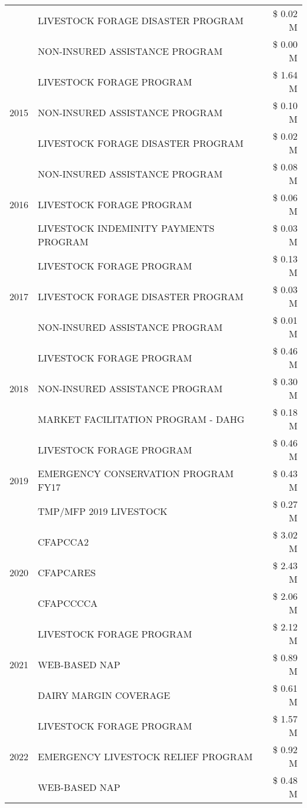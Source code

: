 \begin{tabular}{llr}
 & LIVESTOCK FORAGE DISASTER PROGRAM & \$ 0.02 M \\
 & NON-INSURED ASSISTANCE PROGRAM & \$ 0.00 M \\
\cline{1-3}
\multirow[t]{3}{*}{2015} & LIVESTOCK FORAGE PROGRAM & \$ 1.64 M \\
 & NON-INSURED ASSISTANCE PROGRAM & \$ 0.10 M \\
 & LIVESTOCK FORAGE DISASTER PROGRAM & \$ 0.02 M \\
\cline{1-3}
\multirow[t]{3}{*}{2016} & NON-INSURED ASSISTANCE PROGRAM & \$ 0.08 M \\
 & LIVESTOCK FORAGE PROGRAM & \$ 0.06 M \\
 & LIVESTOCK INDEMINITY PAYMENTS PROGRAM & \$ 0.03 M \\
\cline{1-3}
\multirow[t]{3}{*}{2017} & LIVESTOCK FORAGE PROGRAM & \$ 0.13 M \\
 & LIVESTOCK FORAGE DISASTER PROGRAM & \$ 0.03 M \\
 & NON-INSURED ASSISTANCE PROGRAM & \$ 0.01 M \\
\cline{1-3}
\multirow[t]{3}{*}{2018} & LIVESTOCK FORAGE PROGRAM & \$ 0.46 M \\
 & NON-INSURED ASSISTANCE PROGRAM & \$ 0.30 M \\
 & MARKET FACILITATION PROGRAM - DAHG & \$ 0.18 M \\
\cline{1-3}
\multirow[t]{3}{*}{2019} & LIVESTOCK FORAGE PROGRAM & \$ 0.46 M \\
 & EMERGENCY CONSERVATION PROGRAM FY17 & \$ 0.43 M \\
 & TMP/MFP 2019 LIVESTOCK & \$ 0.27 M \\
\cline{1-3}
\multirow[t]{3}{*}{2020} & CFAPCCA2 & \$ 3.02 M \\
 & CFAPCARES & \$ 2.43 M \\
 & CFAPCCCCA & \$ 2.06 M \\
\cline{1-3}
\multirow[t]{3}{*}{2021} & LIVESTOCK FORAGE PROGRAM & \$ 2.12 M \\
 & WEB-BASED NAP & \$ 0.89 M \\
 & DAIRY MARGIN COVERAGE & \$ 0.61 M \\
\cline{1-3}
\multirow[t]{3}{*}{2022} & LIVESTOCK FORAGE PROGRAM & \$ 1.57 M \\
 & EMERGENCY LIVESTOCK RELIEF PROGRAM & \$ 0.92 M \\
 & WEB-BASED NAP & \$ 0.48 M \\
\cline{1-3}
\bottomrule
\end{tabular}
